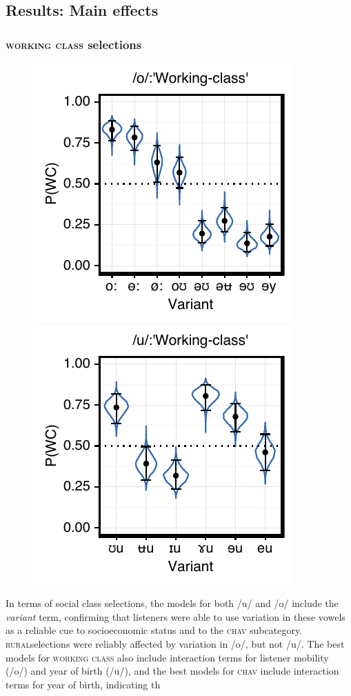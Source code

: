 \documentclass[PWPL]{article}
\begin{document}
\subsection{Results: Main effects}
\subsubsection{\textsc{working class} selections}
\begin{figure}[ht]
\centering
\includegraphics[scale=0.75]{ow_class.pdf}
\includegraphics[scale=0.75]{uw_class.pdf}
\end{figure}
In terms of social class selections, the models for both /u/ and /o/ include the \textit{variant} term, confirming that listeners were able to use variation in these vowels as a reliable cue to socioeconomic status and to the \textsc{chav} subcategory. \textsc{rural}selections were reliably affected by variation in /o/, but not /u/. The best models for \textsc{working class} also include interaction terms for listener mobility (/o/) and year of birth (/u/), and the best models for \textsc{chav} include interaction terms for year of birth, indicating th
\end{document}
